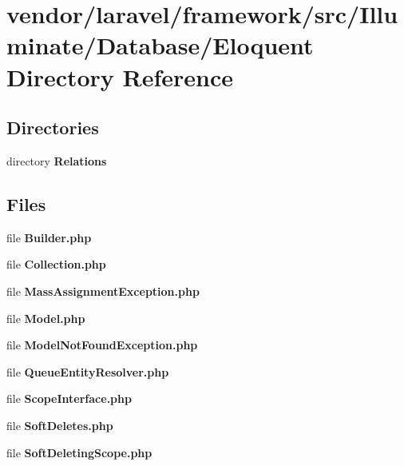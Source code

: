 \section{vendor/laravel/framework/src/\+Illuminate/\+Database/\+Eloquent Directory Reference}
\label{dir_56db758604a301c66b4d7b518bf9c244}
\subsection*{Directories}
\begin{DoxyCompactItemize}
\item 
directory {\bf Relations}
\end{DoxyCompactItemize}
\subsection*{Files}
\begin{DoxyCompactItemize}
\item 
file {\bf Builder.\+php}
\item 
file {\bf Collection.\+php}
\item 
file {\bf Mass\+Assignment\+Exception.\+php}
\item 
file {\bf Model.\+php}
\item 
file {\bf Model\+Not\+Found\+Exception.\+php}
\item 
file {\bf Queue\+Entity\+Resolver.\+php}
\item 
file {\bf Scope\+Interface.\+php}
\item 
file {\bf Soft\+Deletes.\+php}
\item 
file {\bf Soft\+Deleting\+Scope.\+php}
\end{DoxyCompactItemize}
